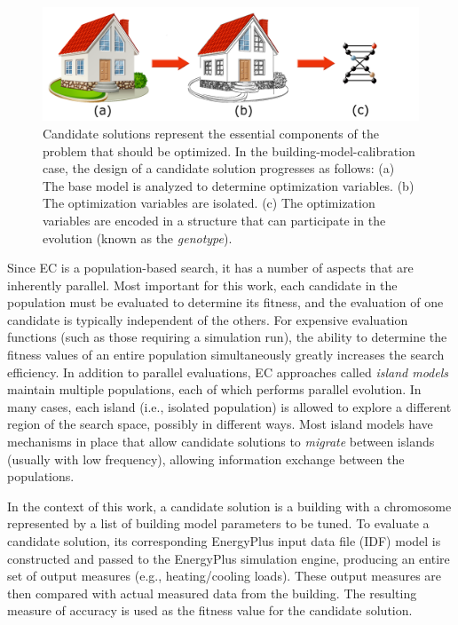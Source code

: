 \documentclass[preprint, review, 12pt]{elsarticle}
\begin{document}
\begin{figure}[htbp]
\centering
\includegraphics[width=5in]{graphics/autotune_chromosome}
\caption{Candidate solutions represent the essential components of the problem that should be optimized. In the building-model-calibration case, the design of a candidate solution progresses as follows: 
(a) The base model is analyzed to determine optimization variables.
(b) The optimization variables are isolated.
(c) The optimization variables are encoded in a structure that can participate in the evolution (known as the \emph{genotype}).}
\label{fig:chromosome}
\end{figure}

Since EC is a population-based search, it has a number of aspects that are inherently parallel. Most important for this work, each candidate in the population must be evaluated to determine its fitness, and the evaluation of one candidate is typically independent of the others. For expensive evaluation functions (such as those requiring a simulation run), the ability to determine the fitness values of an entire population simultaneously greatly increases the search efficiency. In addition to parallel evaluations, EC approaches called \emph{island models} \cite{cit:eiben2007} maintain multiple populations, each of which performs parallel evolution. In many cases, each island (i.e., isolated population) is allowed to explore a different region of the search space, possibly in different ways. Most island models have mechanisms in place that allow candidate solutions to \emph{migrate} between islands (usually with low frequency), allowing information exchange between the populations.

In the context of this work, a candidate solution is a building with a chromosome represented by a list of building model parameters to be tuned. To evaluate a candidate solution, its corresponding EnergyPlus input data file (IDF) model is constructed and passed to the EnergyPlus simulation engine, producing an entire set of output measures (e.g., heating/cooling loads). These output measures are then compared with actual measured data from the building. The resulting measure of accuracy is used as the fitness value for the candidate solution. 
\end{document}
